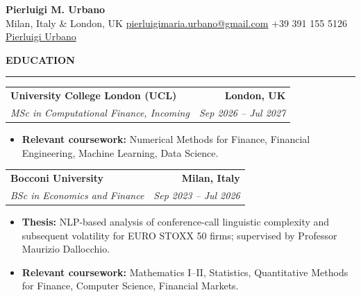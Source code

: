 \documentclass[10pt,letterpaper]{article}
\makeatletter
\newcommand{\cvsection}[1]{%
    \vspace{5pt}%
    {\large\textbf{\MakeUppercase{#1}}}%
    \vspace{2pt}
    \hrule%
    \vspace{5pt}%
}
\newcommand{\cventry}[4]{%
    \vspace{4pt}%
    \noindent
    \begin{tabular*}{\textwidth}{@{}l@{\extracolsep{\fill}}r@{}}
        \large{\textbf{#1}} & \textbf{#2} \\
        \textit{#3} & \textit{#4}
    \end{tabular*}%
    \par\vspace{-2pt}%
}
\newenvironment{cvitems}{%
    \begin{itemize}[
        leftmargin=1.5em,
        itemsep=2pt,
        topsep=5pt,
        parsep=0pt,
        partopsep=0pt
    ]
}{%
    \end{itemize}
}
\makeatother
\begin{document}

\begin{center}



    
    {\Huge \textbf{Pierluigi M. Urbano}} \\[5pt]

    

    \small {} \space Milan, Italy \& London, UK
    \quad
     \space \href{mailto:pierluigimaria.urbano@gmail.com}{pierluigimaria.urbano@gmail.com}
    \quad
     \space +39 391 155 5126
    \quad
     \space \href{https://www.linkedin.com/in/pierluigiurbano/}{Pierluigi Urbano}
    \vspace{-4pt}
    
    

\end{center}




\cvsection{Education}

\cventry
{University College London (UCL)}
{London, UK}
{MSc in Computational Finance, Incoming}
{Sep 2026 -- Jul 2027}

\begin{cvitems}

    \item \textbf{Relevant coursework:} Numerical Methods for Finance, Financial Engineering, Machine Learning, Data Science.
    
\end{cvitems}

\cventry
{Bocconi University}
{Milan, Italy}
{BSc in Economics and Finance \normalfont{-- \textbf{GPA:} 29.5/30}}
{Sep 2023 -- Jul 2026}

\begin{cvitems}

    \item \textbf{Thesis:} NLP-based analysis of conference-call linguistic complexity and subsequent volatility for EURO STOXX 50 firms; supervised by Professor Maurizio Dallocchio.
    
    \item \textbf{Relevant coursework:} Mathematics I--II, Statistics, Quantitative Methods for Finance, Computer Science, Financial Markets.
    
\end{cvitems}
\end{document}
